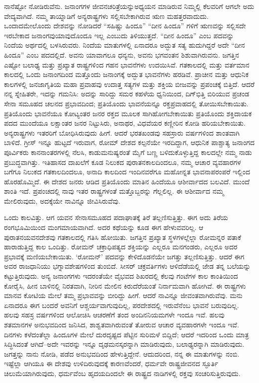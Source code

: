 ನಾನೆಷ್ಟೋ ನೋಡಿರುವೆನು. ಜನಾಂಗಗಳ ಜೀವನಚರಿತ್ರೆಯನ್ನು\break ಅಧ್ಯಯನ ಮಾಡಿರುವ ನಿಮ್ಮಲ್ಲಿ ಕೆಲವರಿಗೆ ಆಗಲೇ ಅದು ವೇದ್ಯವಾಗಿದೆ. ನಮ್ಮ ತಾಯ್ನಾಡಿಗೆ ಅನ್ಯರಾಷ್ಟ್ರಗಳು ಸಲ್ಲಿಸಬೇಕಾಗಿರುವ ಋಣ ಮಹತ್ತರವಾದುದು. ಒಂದಾದಮೇಲೊಂದು ದೇಶವನ್ನು ನೋಡಿದರೆ “ಸಹಿಷ್ಣು ಹಿಂದೂ” “ದೀನ ಹಿಂದೂ” ಗಳಿಗೆ ಋಣವನ್ನು ಸಲ್ಲಿಸದೇ ಇರಬೇಕಾದ ಜನಾಂಗವು\break ಯಾವುದೊಂದೂ ಇಲ್ಲ ಎಂಬುದು ತಿಳಿಯುತ್ತದೆ. “ದೀನ ಹಿಂದೂ” ಎಂಬ ಪದವನ್ನು ನಿಂದೆಯ ಅರ್ಥದಲ್ಲಿ ಬಳಸಿರುವರು. ನಿಂದೆಯ ಮಾತುಗಳಲ್ಲಿ ಏನಾದರೂ ಅದ್ಭುತ ಸತ್ಯ ಹುದುಗಿದ್ದರೆ ಅದೇ “ದೀನ ಹಿಂದೂ” ಎಂಬ ಪದದಲ್ಲಿದೆ. ಅವನು ಯಾವಾಗಲೂ ಧನ್ಯನು, ಅವನು ಭಗವಂತನ ಶಿಶುವಾಗಿರುವನು. ಜಗತ್ತಿನ ಎಷ್ಟೋ ಬಲಾಢ್ಯ ಮತ್ತು ಪ್ರಖ್ಯಾತ ರಾಷ್ಟ್ರಗಳಿಂದ ಗಹನ ಭಾವನೆಗಳು ಉದಯಿಸಿವೆ. ಗತಕಾಲದಲ್ಲಿ ಮತ್ತು ವರ್ತಮಾನ ಕಾಲದಲ್ಲಿ ಒಂದು ಜನಾಂಗದಿಂದ ಮತ್ತೊಂದು ಜನಾಂಗಕ್ಕೆ ಅದ್ಭುತ ಭಾವನೆಗಳು ಹರಡಿವೆ. ಪ್ರಾಚೀನ ಮತ್ತು ಆಧುನಿಕ ಕಾಲಗಳಲ್ಲಿ ಜನಜಾಗೃತಿಯ ಮಹಾ ಪ್ರವಾಹವು ಉದಾತ್ತ ಸತ್ಯಗಳ ಮತ್ತು ಶಕ್ತಿಯ ಬೀಜವನ್ನು ಪ್ರಪಂಚಕ್ಕೆ ಬಿತ್ತಿದೆ. ಆದರೆ ನನ್ನ ಸ್ನೇಹಿತರೇ, ಇದನ್ನು ಗಮನಿಸಿ: ಅದನ್ನು ಸಾರಿದ್ದು ಸಮರ ಕಹಳೆಯ ಧ್ವನಿಯಿಂದ, ದಿಗ್​ಭಿತ್ತಿ ಬಿರಿಯುವ ಪ್ರಚಂಡ ಸೇನಾ ಸಮೂಹದ ಚಲನದ ಪ್ರಭಾವದಿಂದ; ಪ್ರತಿಯೊಂದು ಭಾವನೆಯನ್ನೂ ರಕ್ತಪ್ರವಾಹದಲ್ಲಿ ತೋಯಿಸಬೇಕಾಯಿತು. ಪ್ರತಿಯೊಂದು ಭಾವನೆಯೂ ಕೋಟ್ಯಂತರ ಜನರ ರಕ್ತದ ಮೂಲಕ ಸಾಗಿಹೋಗಬೇಕಾಯಿತು ಪ್ರತಿಯೊಂದು ಶಕ್ತಿದಾಯಕ ಪದದ ಮುಂದೆಯೂ ಲಕ್ಷಾಂತರ ಜನರ ನಿಟ್ಟುಸಿರು, ಅನಾಥರ, ವಿಧವೆಯರ ಕಣ್ಣೀರಿನ ಕೋಡಿ ಹರಿಯಬೇಕಾಯಿತು. ಅನ್ಯರಾಷ್ಟ್ರಗಳು ಇತರರಿಗೆ ಬೋಧಿಸಿರುವುದು ಹೀಗೆ. ಆದರೆ ಭರತಖಂಡವು ಸಹಸ್ರಾರು ವರ್ಷಗಳಿಂದ ಶಾಂತವಾಗಿ ಬಾಳಿದೆ. ಗ್ರೀಸ್​ ಇನ್ನೂ ಹುಟ್ಟದೆ ಇರುವಾಗ, ರೋಮ್​ ದೇಶದ ಕಲ್ಪನೆಯೇ ಇರದಿದ್ದಾಗ, ಆಧುನಿಕ ಪಾಶ್ಚಾತ್ಯ ಜನಾಂಗದ ಪೂರ್ವಿಕರು ಕಾನನಾಂತರಗಳಲ್ಲಿ ನೆಲಸಿ, ಕಾಡುಮನುಷ್ಯರಂತೆ ಮೈಗೆ ಬಣ್ಣ ಬಳಿದುಕೊಳ್ಳುತ್ತಿದ್ದ ಕಾಲದಲ್ಲೇ ನಮ್ಮ ನಾಡು ಪ್ರಬುದ್ಧವಾಗಿತ್ತು. ಇತಿಹಾಸದ ದಾಖಲೆಗೆ ಕೂಡ ನಿಲುಕದ ಪುರಾತನಕಾಲದಿಂದಲೂ, ನಮ್ಮ ಆಚಾರ ವ್ಯವಹಾರಗಳ ಬಗೆಗೂ ನಿಲುಕದ ಗತಕಾಲದಿಂದಲೂ, ಅನಾದಿ ಕಾಲದಿಂದ ಇಂದಿನವರೆಗೂ ಮಹೋನ್ನತ ಭಾವನಾಪರಂಪರೆ ಇಲ್ಲಿಂದ ಹೊರಹೊಮ್ಮಿದೆ. ಈ ದೇಶದ ಜನರು ಆಡಿದ ಪ್ರತಿಯೊಂದು ಮಾತಿನ ಹಿಂದೆಯೂ ಆಶೀರ್ವಾದದ ಬಲವಿದೆ. ಮುಂದೆ ಶಾಂತಿ ಇದೆ. ಪ್ರಪಂಚದಲ್ಲಿ ನಾವು ಇತರ ರಾಷ್ಟ್ರಗಳಂತೆ ಮತ್ತೊಬ್ಬರನ್ನು ಗೆಲ್ಲಲಿಲ್ಲ. ಈ ಆಶೀರ್ವಾದ ನಮ್ಮ ಮೇಲಿರುವುದು, ಅದಕ್ಕೆಯೇ ನಾವಿನ್ನೂ ಜೀವಿಸಿರುವೆವು.

ಒಂದು ಕಾಲವಿತ್ತು. ಆಗ ಯವನ ಸೇನಾಸಮೂಹದ ಪದಾಘಾತಕ್ಕೆ ತಿರೆ ತಲ್ಲಣಿಸುತ್ತಿತ್ತು. ಈಗ ಅದು ತಿರೆಯ ರಂಗಭೂಮಿಯಿಂದ ಮಂಗಮಾಯವಾಗಿದೆ. ಅದರ ಕಥೆಯನ್ನು ಕೂಡ ಈಗ ಹೇಳುವವರಿಲ್ಲ. ಆ ಪುರಾತನ\break ಯವನದೇಶವು ಗತಕಾಲದಲ್ಲಿ ಗತಿಸಿ ಹೋಯಿತು. ಜಗತ್ತಿನ ಪ್ರಖ್ಯಾತ ಸ್ಥಳಗಳಲ್ಲೆಲ್ಲಾ ರೋಮನ್ನರ ಪತಾಕೆ ಹಾರಾಡುತ್ತಿದ್ದ ಕಾಲ ಒಂದಿತ್ತು. ರೋಮನ್​ ಚಕ್ರಾಧಿಪತ್ಯದ ಶಕ್ತಿಯನ್ನು ಎಲ್ಲರೂ ಮನಗಂಡರು, ಎಲ್ಲರೂ ಅದರ ಪ್ರಭಾವಕ್ಕೆ ಮಣಿಯಬೇಕಾಯಿತು. ‘ರೋಮನ್​’ ಪದವನ್ನು ಕೇಳಿದೊಡನೆಯೇ ಜಗತ್ತು ತಲ್ಲಣಿಸುತ್ತಿತ್ತು. ಆದರೆ ಈಗ ಅವರ ರಾಜಧಾನಿಯು ಭಗ್ನಾವಶೇಷಗಳಿಂದ ತುಂಬಿದೆ. ಸೀಸರ್​ ಚಕ್ರವರ್ತಿಗಳು ಆಳಿದೆಡೆಯಲ್ಲಿ ಜೇಡ ತನ್ನ ಬಲೆಯನ್ನು ಕಟ್ಟುತ್ತಿರುವುದು. ಅನ್ಯ ಜನಾಂಗಗಳು ಇದರಂತೆಯೇ ವೈಭವದ ಶಿಖರದಲ್ಲಿ ಕೆಲವು ಗಂಟೆಗಳ ಕಾಲ ಕಾಂತಿಯಿಂದ ಕೋರೈಸಿ, ಹೀನ ಬಾಳಿನಲ್ಲಿ ನಿರತವಾಗಿ, ನೀರಿನ ಮೇಲಿನ ಕಿರುದೆರೆಯಂತೆ ನಿರ್ನಾಮವಾಗಿ ಹೋಗಿವೆ. ಈ ರಾಷ್ಟ್ರಗಳು ಮಾನವ ಕೋಟಿಯ ಮೇಲೆ ತಮ್ಮ ಪ್ರಭಾವವನ್ನು ಬೀರಿದ್ದು ಹೀಗೆ. ಆದರೆ ನಾವಿನ್ನೂ ಜೀವಂತವಾಗಿರುವೆವು. ಮನು ಏನಾದರೂ ಈಗ ಬಂದರೆ ಅವನಿಗೆ ಆಶ್ಚರ್ಯವಾಗುವುದಿಲ್ಲ, ಪರದೇಶದಲ್ಲಿ ಇರುವೆನೆಂಬ ಭಾವನೆ ಬರುವುದಿಲ್ಲ. ಹಲವು ಸಹಸ್ರ ವರ್ಷಗಳಿಂದ ಆಲೋಚಿಸಿ ಆಚರಣೆಗೆ ತಂದ ಅಂದಿನ\break ನಿಯಮಗಳೇ ಇಂದೂ ಇವೆ. ಹಲವು ಶತಮಾನಗಳ ಅನುಭವದಿಂದ ಜನಿಸಿದ, ಶಾಶ್ವತವಾಗಿರುವಂತೆ ತೋರುವ ಆಚಾರ ವ್ಯವಹಾರಗಳೇ ಇಂದೂ ಇವೆ. ದಿನಗಳು ಕಳೆದಂತೆಲ್ಲಾ ಹಿಂದೂಗಳ ಮೇಲೆ ದುರದೃಷ್ಟದ ಪೆಟ್ಟಿನ ಸುರಿಮಳೆ ಬಿದ್ದಿದೆ; ಆದರೆ ಇದರಿಂದ ಒಂದು ಮಾತ್ರ ಸಿದ್ಧಿಸಿದಂತೆ ಆಗಿದೆ–ಅದೇ ಇವರನ್ನು ಇನ್ನೂ ದೃಢಮನಸ್ಕರನ್ನಾಗಿ ಮಾಡಿರುವುದು, ಬಲಾಢ್ಯರನ್ನಾಗಿ ಮಾಡಿರುವುದು. ಜಗತ್ತನ್ನು ನಾನು ನೋಡಿ, ಪಡೆದ ಅನುಭವದಿಂದ ಹೇಳುತ್ತಿದ್ದೇನೆ. ಆದುದರಿಂದ, ನನ್ನ ಈ ಮಾತುಗಳನ್ನು ನಂಬಿ. ಇಷ್ಟೆಲ್ಲಾ ಆಗಿಯೂ ಈ ದೇಶವು ಉಳಿದಿರುವುದಕ್ಕೆ ಕಾರಣವೆಂದರೆ, ಧರ್ಮವೇ ರಾಷ್ಟ್ರಜೀವನದ ಸ್ಫೂರ್ತಿ ಚಿಲುಮೆಯಾಗಿರುವುದು, ಧರ್ಮವೆಂಬ ಹೃದಯದಿಂದಲೇ ಈ ರಾಷ್ಟ್ರದ ನಾಡಿಗಳಲ್ಲಿ ರಕ್ತವು ಸಂಚರಿಸುತ್ತಿರುವುದು.

